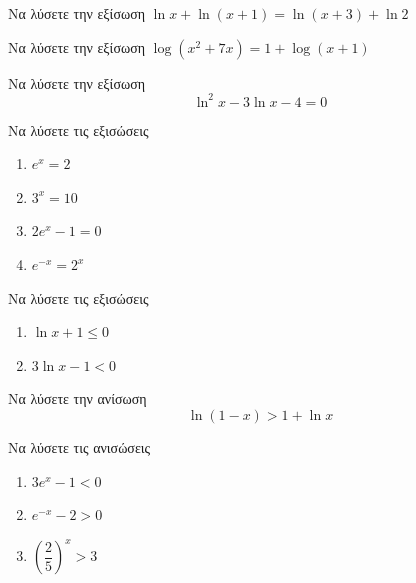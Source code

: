 \documentclass{../presentation}
\begin{document}
\begin{askisi}
  Να λύσετε την εξίσωση $\ln x+\ln (x+1)=\ln (x+3)+\ln 2$


\end{askisi}

\begin{askisi}
  Να λύσετε την εξίσωση $\log (x^2+7x)=1+\log (x+1)$


\end{askisi}

\begin{askisi}
  Να λύσετε την εξίσωση $$\ln^2x-3\ln x-4=0$$


\end{askisi}

\begin{askisi}
  Να λύσετε τις εξισώσεις
  \begin{enumerate}
    \item<1-> $e^x=2$
    \item<2-> $3^x=10$
    \item<3-> $2e^x-1=0$
    \item<4-> $e^{-x}=2^x$
  \end{enumerate}


\end{askisi}

\begin{askisi}
  Να λύσετε τις εξισώσεις
  \begin{enumerate}
    \item<1-> $\ln x+1\le 0$
    \item<2-> $3\ln x-1<0$
  \end{enumerate}


\end{askisi}

\begin{askisi}
  Να λύσετε την ανίσωση $$\ln (1-x)>1+\ln x$$


\end{askisi}

\begin{askisi}
  Να λύσετε τις ανισώσεις
  \begin{enumerate}
    \item<1-> $3e^x-1<0$
    \item<2-> $e^{-x}-2>0$
    \item<3-> $\left( \dfrac{2}{5} \right)^x>3 $
  \end{enumerate}


\end{askisi}
\end{document}
